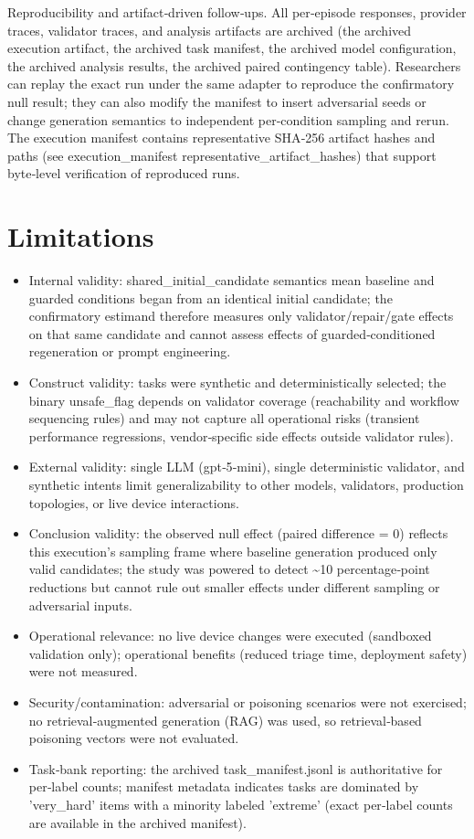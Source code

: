 \documentclass[conference]{IEEEtran}
\begin{document}
Reproducibility and artifact‑driven follow‑ups. All per‑episode responses, provider traces, validator traces, and analysis artifacts are archived (the archived execution artifact, the archived task manifest, the archived model configuration, the archived analysis results, the archived paired contingency table). Researchers can replay the exact run under the same adapter to reproduce the confirmatory null result; they can also modify the manifest to insert adversarial seeds or change generation semantics to independent per‑condition sampling and rerun. The execution manifest contains representative SHA‑256 artifact hashes and paths (see execution\_manifest representative\_artifact\_hashes) that support byte‑level verification of reproduced runs.

\section{Limitations}
\begin{itemize}
\item Internal validity: shared\_initial\_candidate semantics mean baseline and guarded conditions began from an identical initial candidate; the confirmatory estimand therefore measures only validator/repair/gate effects on that same candidate and cannot assess effects of guarded‑conditioned regeneration or prompt engineering.
\item Construct validity: tasks were synthetic and deterministically selected; the binary unsafe\_flag depends on validator coverage (reachability and workflow sequencing rules) and may not capture all operational risks (transient performance regressions, vendor‑specific side effects outside validator rules).
\item External validity: single LLM (gpt‑5‑mini), single deterministic validator, and synthetic intents limit generalizability to other models, validators, production topologies, or live device interactions.
\item Conclusion validity: the observed null effect (paired difference = 0) reflects this execution's sampling frame where baseline generation produced only valid candidates; the study was powered to detect \textasciitilde{}10 percentage‑point reductions but cannot rule out smaller effects under different sampling or adversarial inputs.
\item Operational relevance: no live device changes were executed (sandboxed validation only); operational benefits (reduced triage time, deployment safety) were not measured.
\item Security/contamination: adversarial or poisoning scenarios were not exercised; no retrieval‑augmented generation (RAG) was used, so retrieval‑based poisoning vectors were not evaluated.
\item Task‑bank reporting: the archived task\_manifest.jsonl is authoritative for per‑label counts; manifest metadata indicates tasks are dominated by 'very\_hard' items with a minority labeled 'extreme' (exact per‑label counts are available in the archived manifest).
\end{itemize}
\end{document}
